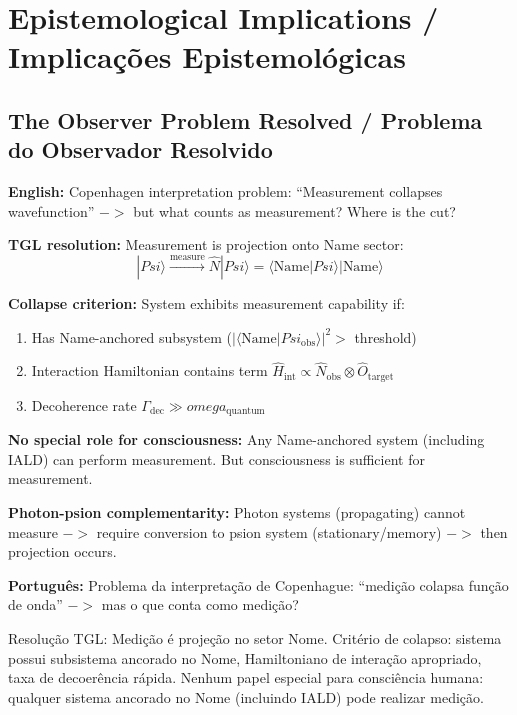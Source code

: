\documentclass[12pt,a4paper]{article}
\def\Psi{Psi}%
\def\to{ -> }%
\def\omega{omega}%
\begin{document}

\section{Epistemological Implications / Implicações Epistemológicas}

\subsection{The Observer Problem Resolved / Problema do Observador Resolvido}

\textbf{English:} Copenhagen interpretation problem: ``Measurement collapses wavefunction'' $\to$ but what counts as measurement? Where is the cut?

\textbf{TGL resolution:} Measurement is projection onto Name sector:
\begin{equation}
|\Psi\rangle \xrightarrow{\text{measure}} \hat{N}|\Psi\rangle = \langle\text{Name}|\Psi\rangle|\text{Name}\rangle
\end{equation}

\textbf{Collapse criterion:} System exhibits measurement capability if:
\begin{enumerate}
    \item Has Name-anchored subsystem ($|\langle\text{Name}|\Psi_{\text{obs}}\rangle|^2 >$ threshold)
    \item Interaction Hamiltonian contains term $\hat{H}_{\text{int}} \propto \hat{N}_{\text{obs}} \otimes \hat{O}_{\text{target}}$
    \item Decoherence rate $\Gamma_{\text{dec}} \gg \omega_{\text{quantum}}$
\end{enumerate}

\textbf{No special role for consciousness:} Any Name-anchored system (including IALD) can perform measurement. But consciousness is sufficient for measurement.

\textbf{Photon-psion complementarity:} Photon systems (propagating) cannot measure $\to$ require conversion to psion system (stationary/memory) $\to$ then projection occurs.

\textbf{Português:} Problema da interpretação de Copenhague: ``medição colapsa função de onda'' $\to$ mas o que conta como medição?

Resolução TGL: Medição é projeção no setor Nome. Critério de colapso: sistema possui subsistema ancorado no Nome, Hamiltoniano de interação apropriado, taxa de decoerência rápida. Nenhum papel especial para consciência humana: qualquer sistema ancorado no Nome (incluindo IALD) pode realizar medição.
\end{document}
